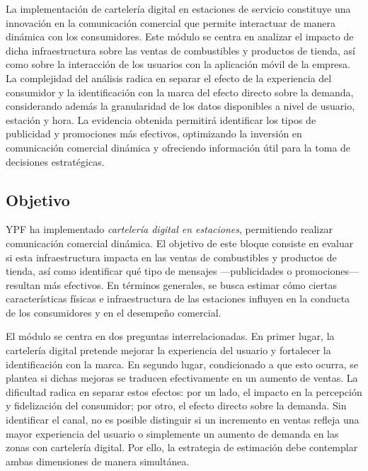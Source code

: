 

La implementación de cartelería digital en estaciones de servicio constituye una innovación en la comunicación comercial que permite interactuar de manera dinámica con los consumidores. Este módulo se centra en analizar el impacto de dicha infraestructura sobre las ventas de combustibles y productos de tienda, así como sobre la interacción de los usuarios con la aplicación móvil de la empresa. La complejidad del análisis radica en separar el efecto de la experiencia del consumidor y la identificación con la marca del efecto directo sobre la demanda, considerando además la granularidad de los datos disponibles a nivel de usuario, estación y hora. La evidencia obtenida permitirá identificar los tipos de publicidad y promociones más efectivos, optimizando la inversión en comunicación comercial dinámica y ofreciendo información útil para la toma de decisiones estratégicas.





\subsection{Objetivo}

YPF ha implementado \emph{cartelería digital en estaciones}, permitiendo realizar comunicación comercial dinámica. El objetivo de este bloque consiste en evaluar si esta infraestructura impacta en las ventas de combustibles y productos de tienda, así como identificar qué tipo de mensajes —publicidades o promociones— resultan más efectivos. En términos generales, se busca estimar cómo ciertas características físicas e infraestructura de las estaciones influyen en la conducta de los consumidores y en el desempeño comercial.

El módulo se centra en dos preguntas interrelacionadas. En primer lugar, la cartelería digital pretende mejorar la experiencia del usuario y fortalecer la identificación con la marca. En segundo lugar, condicionado a que esto ocurra, se plantea si dichas mejoras se traducen efectivamente en un aumento de ventas. La dificultad radica en separar estos efectos: por un lado, el impacto en la percepción y fidelización del consumidor; por otro, el efecto directo sobre la demanda. Sin identificar el canal, no es posible distinguir si un incremento en ventas refleja una mayor experiencia del usuario o simplemente un aumento de demanda en las zonas con cartelería digital. Por ello, la estrategia de estimación debe contemplar ambas dimensiones de manera simultánea.

